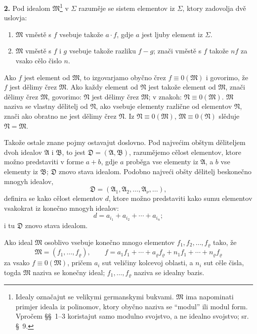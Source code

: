 \documentclass[11pt]{article}
\newcommand{\ideal}[1]{\mathfrak{#1}}
\begin{document}
\textbf{2.} Pod idealom \(\ideal M\)\footnote{Idealy označajut se velikymi germanskymi bukvami. \(\ideal M\) ima napominati primjer ideala iz polinomov, ktory obyčno naziva se ``modul'' ili modul form. Vpročem \S\S~1--3 koristajut samo modulno svojstvo, a ne idealno svojstvo; sr. \S~9.} v \(\Sigma\) razuměje se sistem elementov iz \(\Sigma\), ktory zadovolja dvě uslovja:
\begin{enumerate}
\item \(\ideal M\) vměstě s \(f\) vsebuje takože \(a\cdot f\), gdje \(a\) jest ljuby element iz \(\Sigma\).
\item \(\ideal M\) vměstě s \(f\) i \(g\) vsebuje takože razliku \(f-g\); znači vměstě s \(f\) takože \(nf\) za vsako cělo čislo \(n\).
\end{enumerate}
Ako \(f\) jest element od \(\ideal M\), to izgovarjamo obyčno črez \(f\equiv0(\ideal M)\) i govorimo, že \(f\) jest dělimy črez \(\ideal M\). Ako každy element od \(\ideal N\) jest takože element od \(\ideal M\), znači dělimy črez \(\ideal M\), govorimo: \(\ideal N\) jest dělimy črez \(\ideal M\); v znakoh: \(\ideal N\equiv0(\ideal M)\). \(\ideal M\) naziva se vlastny dělitelj od \(\ideal N\), ako vsebuje elementy različne od elementov \(\ideal N\), znači ako obratno ne jest dělimy črez \(\ideal N\). Iz \(\ideal N\equiv0(\ideal M)\), \(\ideal M\equiv0(\ideal N)\) slěduje \(\ideal N=\ideal M\).

Takože ostale znane pojmy ostavajut doslovno. Pod najvećim obštym děliteljem dvoh idealov \(\ideal A\) i \(\ideal B\), to jest \(\ideal D=(\ideal A,\ideal B)\), razumějemo cělost elementov, ktore možno predstaviti v forme \(a+b\), gdje \(a\) proběga vse elementy iz \(\ideal A\), a \(b\) vse elementy iz \(\ideal B\); \(\ideal D\) znovo stava idealom. Podobno najveći obšty dělitelj beskonečno mnogyh idealov,
\[
 \ideal D=(\ideal A_1,\ideal A_2,\ldots,\ideal A_\nu,\ldots),
\]
definira se kako cělost elementov \(d\), ktore možno predstaviti kako sumu elementov vsakokrat iz konečno mnogyh idealov:
\[
 d=a_{i_1}+a_{i_2}+\cdots+a_{i_n};
\]
i tu \(\ideal D\) znovo stava idealom.

Ako ideal \(\ideal M\) osoblivo vsebuje konečno mnogo elementov \(f_1,f_2,\ldots,f_\varrho\) tako, že
\[
 \ideal M=(f_1,\ldots,f_\varrho),\qquad
 f=a_1f_1+\cdots+a_\varrho f_\varrho+n_1f_1+\cdots+n_\varrho f_\varrho
\]
za vsako \(f\equiv0(\ideal M)\), pričem \(a_i\) sut veličiny kolcevoj oblasti, a \(n_i\) sut cěle čisla, togda \(\ideal M\) naziva se konečny ideal; \(f_1,\ldots,f_\varrho\) naziva se idealny bazis.
\end{document}
